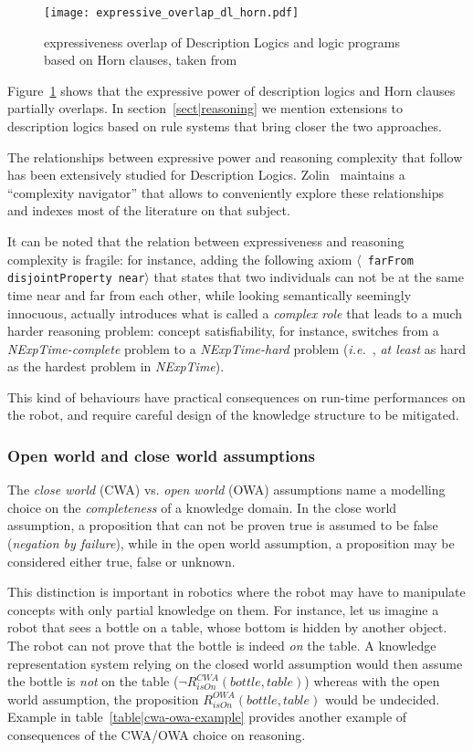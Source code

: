 \documentclass[a4paper, twocolumn]{article}
\newcommand{\ie}{{\textit{i.e.\ }}}
\newcommand{\stmt}[1]{{\footnotesize \tt $\langle$ #1\relax$\rangle$}}
\begin{document}
\begin{figure}
    \centering
    \texttt{[image: expressive\_overlap\_dl\_horn.pdf]}
    \caption{expressiveness overlap of Description Logics and logic programs
    based on Horn clauses, taken from~\cite{Grosof2003}}
    \label{fig|overlap_dl_horn}
\end{figure}

Figure~\ref{fig|overlap_dl_horn} shows that the expressive power of description
logics and Horn clauses partially overlaps. In section~\ref{sect|reasoning} we
mention extensions to description logics based on rule systems that bring closer
the two approaches.

The relationships between expressive power and reasoning complexity that follow
has been extensively studied for Description Logics.
Zolin~\cite{ZolinDLComplexityNavigator} maintains a ``complexity navigator''
that allows to conveniently explore these relationships and indexes most of the
literature on that subject.

It can be noted that the relation between expressiveness and reasoning
complexity is fragile: for instance, adding the following axiom \stmt{farFrom
disjointProperty near} that states that two individuals can not be at the same
time near and far from each other, while looking semantically seemingly
innocuous, actually introduces what is called a \emph{complex role} that leads
to a much harder reasoning problem: concept satisfiability, for instance,
switches from a {\it NExpTime-complete} problem to a {\it NExpTime-hard}
problem (\ie, \emph{at least} as hard as the hardest problem in {\it
NExpTime}).

This kind of behaviours have practical consequences on run-time performances on
the robot, and require careful design of the knowledge structure to be mitigated.

\subsubsection{Open world and close world assumptions}
\label{sect|owa-cwa}

The \emph{close world} (CWA) vs. \emph{open world} (OWA) assumptions name a
modelling choice on the \emph{completeness} of a knowledge domain. In the close
world assumption, a proposition that can not be proven true is assumed to be
false (\emph{negation by failure}), while in the open world assumption, a
proposition may be considered either true, false or unknown.

This distinction is important in robotics where the robot may have to manipulate
concepts with only partial knowledge on them. For instance, let us imagine a robot
that sees a bottle on a table, whose bottom is hidden by another object. The
robot can not prove that the bottle is indeed \emph{on} the table. A knowledge
representation system relying on the closed world assumption would then assume
the bottle is \emph{not} on the table ($\lnot R^{CWA}_{isOn}(bottle, table)$)
whereas with the open world assumption, the proposition $R^{OWA}_{isOn}(bottle,
table)$ would be undecided. Example in table~\ref{table|cwa-owa-example} provides
another example of consequences of the CWA/OWA choice on reasoning.
\end{document}
